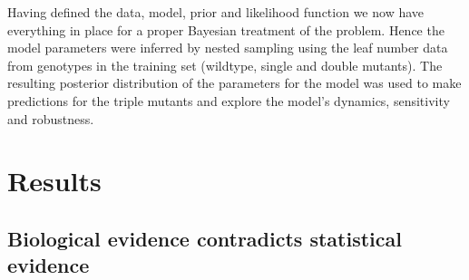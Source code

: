 Having defined the data, model, prior and likelihood function we now have everything in place for a proper Bayesian treatment of the problem.
Hence the model parameters were inferred by nested sampling using the leaf number data from genotypes in the training set (wildtype, single and double mutants).
The resulting posterior distribution of the parameters for the model was used to make predictions for the triple mutants and explore the model's dynamics, sensitivity and robustness.

\section{Results}
\subsection{Biological evidence contradicts statistical evidence}

